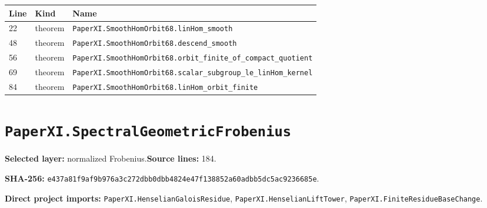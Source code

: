\documentclass[10pt,oneside]{book}
\begin{document}
\begin{longtable}{@{}p{}p{}p{}@{}}\toprule Line&Kind&Name\\\midrule\endhead

22&theorem&\nolinkurl{PaperXI.SmoothHomOrbit68.linHom_smooth}\\

48&theorem&\nolinkurl{PaperXI.SmoothHomOrbit68.descend_smooth}\\

56&theorem&\nolinkurl{PaperXI.SmoothHomOrbit68.orbit_finite_of_compact_quotient}\\

69&theorem&\nolinkurl{PaperXI.SmoothHomOrbit68.scalar_subgroup_le_linHom_kernel}\\

84&theorem&\nolinkurl{PaperXI.SmoothHomOrbit68.linHom_orbit_finite}\\

\bottomrule\end{longtable}

\section{\texorpdfstring{\nolinkurl{PaperXI.SpectralGeometricFrobenius}}{PaperXI.SpectralGeometricFrobenius}}\label{module:PaperXI.SpectralGeometricFrobenius}

\textbf{Selected layer:} normalized Frobenius.\quad\textbf{Source lines:} 184.\par\textbf{SHA-256:} {\scriptsize\nolinkurl{e437a81f9af9b976a3c272dbb0dbb4824e47f138852a60adbb5dc5ac9236685e}}.


\textbf{Direct project imports:} \nolinkurl{PaperXI.HenselianGaloisResidue}, \nolinkurl{PaperXI.HenselianLiftTower}, \nolinkurl{PaperXI.FiniteResidueBaseChange}.
\end{document}
